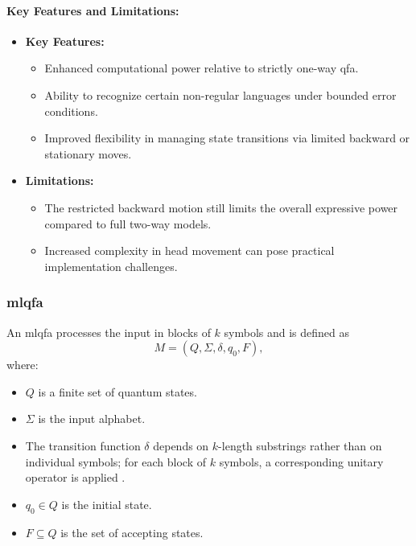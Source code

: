 \paragraph{Key Features and Limitations:}
\begin{itemize}
    \item \textbf{Key Features:}
    \begin{itemize}
        \item Enhanced computational power relative to strictly one-way \gls{qfa}.
        \item Ability to recognize certain non-regular languages under bounded error conditions.
        \item Improved flexibility in managing state transitions via limited backward or stationary moves.
    \end{itemize}
    \item \textbf{Limitations:}
    \begin{itemize}
        \item The restricted backward motion still limits the overall expressive power compared to full two-way models.
        \item Increased complexity in head movement can pose practical implementation challenges.
    \end{itemize}
\end{itemize}

\subsubsection{\gls{mlqfa}}
\label{sssec:ml-qfa}
\begin{definition}
An \gls{mlqfa} processes the input in blocks of \( k \) symbols and is defined as 
\[
M = (Q, \Sigma, \delta, q_0, F),
\]
where:
\begin{itemize}
    \item \( Q \) is a finite set of quantum states.
    \item \( \Sigma \) is the input alphabet.
    \item The transition function \(\delta\) depends on \( k \)-length substrings rather than on individual symbols; for each block of \( k \) symbols, a corresponding unitary operator is applied \cite{belovs2007multi}.
    \item \( q_0 \in Q \) is the initial state.
    \item \( F \subseteq Q \) is the set of accepting states.
\end{itemize}
\end{definition}

